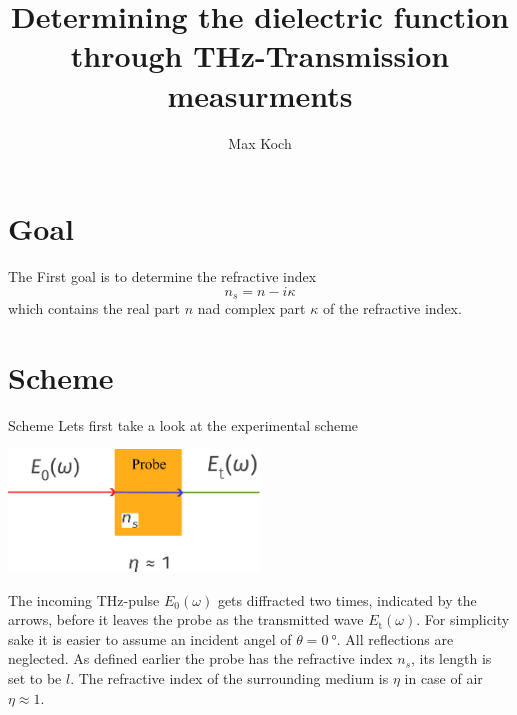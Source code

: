 \documentclass[aspectratio=1610, 9pt]{beamer}
\title{Determining the dielectric function through THz-Transmission measurments}
\author[M.~Koch]{Max Koch}
\institute[AG Wang]{Arbeitsgruppe Wang \\  Fakultät Physik}
\begin{document}
\maketitle

\section{Goal}
\begin{frame}
The First goal is to determine the refractive index 
\begin{equation}
  n_s = n - i\kappa
\end{equation}
which contains the real part $n$ nad complex part $\kappa$ of the refractive index.
\end{frame}

\section{Scheme}
\begin{frame}{Scheme}
  Lets first take a look at the experimental scheme
  \begin{center}
  \includegraphics[width=0.5\textwidth]{images/Transmission.pdf}
  \end{center}
  The incoming THz-pulse $E_0(\omega)$ gets diffracted two times, indicated by the arrows, before it leaves the probe as the transmitted wave $E_\text{t}(\omega)$.
  For simplicity sake it is easier to assume an incident angel of $\theta=\SI{0}{\degree}$.
  All reflections are neglected.
  As defined earlier the probe has the refractive index $n_s$, its length is set to be $l$.
  The refractive index of the surrounding medium is $\eta$ in case of air $\eta\approx 1$.
\end{frame}
\end{document}
